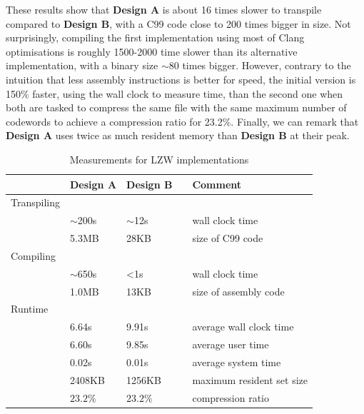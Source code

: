 \documentclass[a4paper,twoside]{article}
\begin{document}
These results show that \textbf{Design A} is about 16 times slower to transpile
compared to \textbf{Design B}, with a C99 code close to 200 times bigger in
size. Not surprisingly, compiling the first implementation using most of Clang
optimisations is roughly 1500-2000 time slower than its alternative
implementation, with a binary size $\sim$80 times bigger. However, contrary to
the intuition that less assembly instructions is better for speed, the initial
version is 150\% faster, using the wall clock to measure time, than the second
one when both are tasked to compress the same file with the same maximum number
of codewords to achieve a compression ratio for 23.2\%. Finally, we can remark
that \textbf{Design A} uses twice as much resident memory than \textbf{Design B}
at their peak.

\begin{table}[h]
\centering
\begin{tabular}{@{}lllll@{}}
\toprule
            & Design A   & Design B    &  & Comment                   \\ \midrule
Transpiling &            &             &  &                           \\
            & $\sim$200s & $\sim$12s   &  & wall clock time           \\
            & 5.3MB      & 28KB        &  & size of C99 code          \\ \midrule
Compiling   &            &             &  &                           \\
            & $\sim$650s & <1s         &  & wall clock time           \\
            & 1.0MB      & 13KB        &  & size of assembly code     \\ \midrule
Runtime     &            &             &  &                           \\
            & 6.64s      & 9.91s       &  & average wall clock time   \\
            & 6.60s      & 9.85s       &  & average user time         \\
            & 0.02s      & 0.01s       &  & average system time       \\
            & 2408KB     & 1256KB      &  & maximum resident set size \\
            & $23.2\%$   & $23.2\%$    &  & compression ratio         \\ \bottomrule
\end{tabular}
\caption{Measurements for LZW implementations}
\label{tab:LZW}
\end{table}
\end{document}
